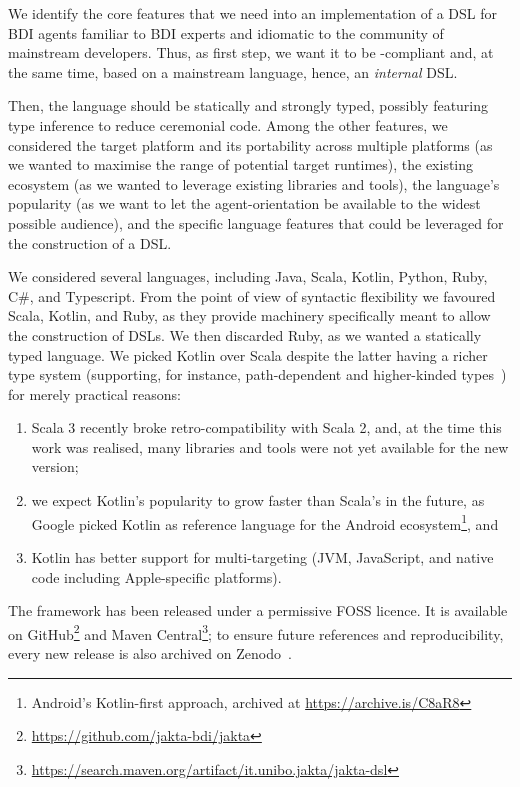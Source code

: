 We identify the core features that we need into an
implementation of a \ac{DSL} for \ac{BDI} agents familiar to \ac{BDI} experts
and idiomatic to the community of mainstream developers.
%
Thus, as first step,
we want it to be \agentspeak{}-compliant
and, at the same time,
based on a mainstream language, hence, an \emph{internal} \ac{DSL}.

Then, the language should be statically and strongly typed,
possibly featuring type inference to reduce ceremonial code.
%
Among the other features,
we considered the target platform and its portability across multiple platforms
(as we wanted to maximise the range of potential target runtimes),
the existing ecosystem (as we wanted to leverage existing libraries and tools),
the language's popularity (as we want to let the agent-orientation be available to the widest possible audience),
and the specific language features that could be leveraged for the construction of a \ac{DSL}.

We considered several languages, including Java, Scala, Kotlin, Python, Ruby, C\#, and Typescript.
%
From the point of view of syntactic flexibility we favoured Scala, Kotlin, and Ruby,
as they provide machinery specifically meant to allow the construction of \acp{DSL}.
%
We then discarded Ruby, as we wanted a statically typed language.
%
We picked Kotlin over Scala despite the latter having a richer type system
(supporting, for instance, path-dependent and higher-kinded types~\cite{JohannP19})
for merely practical reasons:
%
\begin{enumerate}
    \item Scala 3 recently broke retro-compatibility with Scala 2,
    and, at the time this work was realised,
    many libraries and tools were not yet available for the new version;

    \item we expect Kotlin's popularity to grow faster than Scala's in the future,
    as Google picked Kotlin as reference language for the Android ecosystem\footnote{
        Android’s Kotlin-first approach, archived at \url{https://archive.is/C8aR8}
    }, and

    \item Kotlin has better support for multi-targeting
    (\ac{JVM}, JavaScript, and native code including Apple-specific platforms).
\end{enumerate}

The framework has been released under a permissive \ac{FOSS} licence.
%
It is available on GitHub\footnote{
    \url{https://github.com/jakta-bdi/jakta}
} and Maven Central\footnote{
    \url{https://search.maven.org/artifact/it.unibo.jakta/jakta-dsl}
};
to ensure future references and reproducibility,
every new release is also archived on Zenodo~\cite{BaiardiCP23}.

